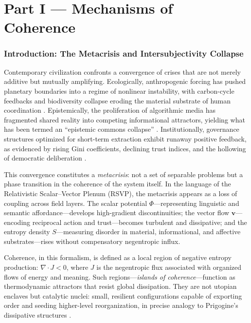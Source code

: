 \documentclass[12pt,a4paper]{article}
\begin{document}
\newpage
\tableofcontents

\newpage
\part{Part I — Mechanisms of Coherence}

\section{Introduction: The Metacrisis and Intersubjectivity Collapse}
Contemporary civilization confronts a convergence of crises that are not merely additive but mutually amplifying. Ecologically, anthropogenic forcing has pushed planetary boundaries into a regime of nonlinear instability, with carbon-cycle feedbacks and biodiversity collapse eroding the material substrate of human coordination \cite{rockstrom2009planetary}. Epistemically, the proliferation of algorithmic media has fragmented shared reality into competing informational attractors, yielding what has been termed an ``epistemic commons collapse'' \cite{pachniewski2024intersubjectivity}. Institutionally, governance structures optimized for short-term extraction exhibit runaway positive feedback, as evidenced by rising Gini coefficients, declining trust indices, and the hollowing of democratic deliberation \cite{schmachtenberger2020metacrisis}.

This convergence constitutes a \emph{metacrisis}: not a set of separable problems but a phase transition in the coherence of the system itself. In the language of the Relativistic Scalar–Vector Plenum (RSVP), the metacrisis appears as a loss of coupling across field layers. The scalar potential $\Phi$—representing linguistic and semantic affordance—develops high-gradient discontinuities; the vector flow $\bm{v}$—encoding reciprocal action and trust—becomes turbulent and dissipative; and the entropy density $S$—measuring disorder in material, informational, and affective substrates—rises without compensatory negentropic influx.

Coherence, in this formalism, is defined as a local region of negative entropy production: $\nabla\!\cdot\!J < 0$, where $J$ is the negentropic flux associated with organized flows of energy and meaning. Such regions—\emph{islands of coherence}—function as thermodynamic attractors that resist global dissipation. They are not utopian enclaves but catalytic nuclei: small, resilient configurations capable of exporting order and seeding higher-level reorganization, in precise analogy to Prigogine’s dissipative structures \cite{prigogine1984order}.
\end{document}

